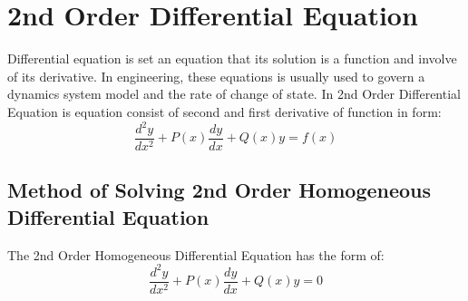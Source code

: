 \chapter{2nd Order Differential Equation}
Differential equation is set an equation that its solution is a function and involve of its derivative. In engineering, these equations is usually used to govern a dynamics system model and the rate of change of state. In 2nd Order Differential Equation is equation consist of second and first derivative of function in form:
\[
\frac{d^2y}{dx^2} + P(x)\frac{dy}{dx} + Q(x) y = f(x)
\]
\section{Method of Solving 2nd Order Homogeneous Differential Equation}
The 2nd Order Homogeneous Differential Equation has the form of:
\[
\frac{d^2y}{dx^2} + P(x)\frac{dy}{dx} + Q(x) y = 0
\]
